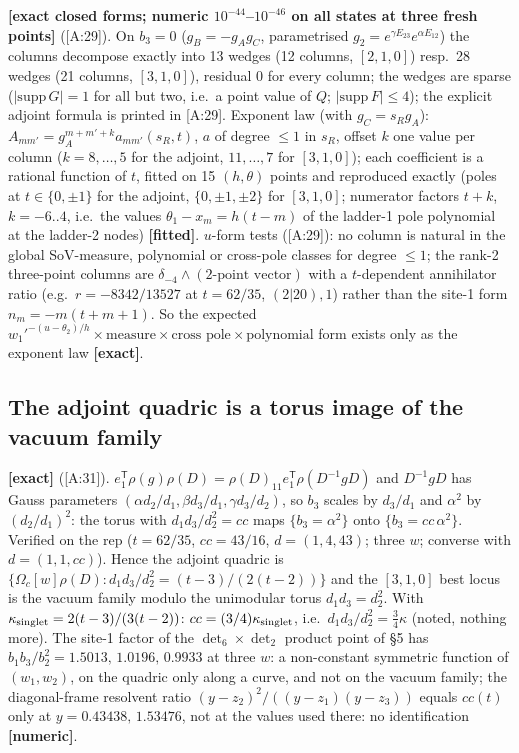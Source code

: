 \documentclass[10pt]{article}
\newcommand{\nb}[1]{\texttt{\path{#1}}}
\newcommand{\cl}[2]{\textsf{[#1:#2]}}
\newcommand{\tg}[1]{\textbf{[#1]}}
\newcommand{\Om}{\Omega}
\begin{document}
\tg{exact closed forms; numeric $10^{-44}$--$10^{-46}$ on all states at three fresh points} (\cl{A}{29}). On $b_3=0$ ($g_B=-g_Ag_C$, parametrised $g_2=e^{\gamma E_{23}}e^{\alpha E_{12}}$) the columns decompose exactly into 13 wedges (12 columns, $[2,1,0]$) resp.\ 28 wedges (21 columns, $[3,1,0]$), residual 0 for every column; the wedges are sparse ($|\mathrm{supp}\,G|=1$ for all but two, i.e.\ a point value of $Q$; $|\mathrm{supp}\,F|\le4$); the explicit adjoint formula is printed in \cl{A}{29}. Exponent law (with $g_C=s_Rg_A$): $A_{mm'}=g_A^{m+m'+k}a_{mm'}(s_R,t)$, $a$ of degree $\le1$ in $s_R$, offset $k$ one value per column ($k=8,\dots,5$ for the adjoint, $11,\dots,7$ for $[3,1,0]$); each coefficient is a rational function of $t$, fitted on 15 $(h,\theta)$ points and reproduced exactly (poles at $t\in\{0,\pm1\}$ for the adjoint, $\{0,\pm1,\pm2\}$ for $[3,1,0]$; numerator factors $t+k$, $k=-6..4$, i.e.\ the values $\theta_1-x_m=h(t-m)$ of the ladder-1 pole polynomial at the ladder-2 nodes) \tg{fitted}. $u$-form tests (\cl{A}{29}): no column is natural in the global SoV-measure, polynomial or cross-pole classes for degree $\le1$; the rank-2 three-point columns are $\delta_{-4}\wedge(\text{2-point vector})$ with a $t$-dependent annihilator ratio (e.g.\ $r=-8342/13527$ at $t=62/35$, $(2|20),1$) rather than the site-1 form $n_m=-m(t+m+1)$. So the expected $w_1'^{-(u-\theta_2)/h}\times\text{measure}\times\text{cross pole}\times\text{polynomial}$ form exists only as the exponent law \tg{exact}.

\subsection{The adjoint quadric is a torus image of the vacuum family}\label{sec:Atorus}

\tg{exact} (\cl{A}{31}). $e_1^{\mathsf T}\rho(g)\rho(D)=\rho(D)_{11}e_1^{\mathsf T}\rho(D^{-1}gD)$ and $D^{-1}gD$ has Gauss parameters $(\alpha d_2/d_1,\beta d_3/d_1,\gamma d_3/d_2)$, so $b_3$ scales by $d_3/d_1$ and $\alpha^2$ by $(d_2/d_1)^2$: the torus with $d_1d_3/d_2^2=cc$ maps $\{b_3=\alpha^2\}$ onto $\{b_3=cc\,\alpha^2\}$. Verified on the rep ($t=62/35$, $cc=43/16$, $d=(1,4,43)$; three $w$; converse with $d=(1,1,cc)$). Hence the adjoint quadric is $\{\Om_c[w]\rho(D):d_1d_3/d_2^2=(t-3)/(2(t-2))\}$ and the $[3,1,0]$ best locus is the vacuum family modulo the unimodular torus $d_1d_3=d_2^2$. With $\kappa_{\rm singlet}=2(t-3)/(3(t-2))$: $cc=(3/4)\kappa_{\rm singlet}$, i.e.\ $d_1d_3/d_2^2=\tfrac34\kappa$ (noted, nothing more). The site-1 factor of the $\det_6\times\det_2$ product point of \nb{Two-rotations-det-overlap.md} \S5 has $b_1b_3/b_2^2=1.5013,\,1.0196,\,0.9933$ at three $w$: a non-constant symmetric function of $(w_1,w_2)$, on the quadric only along a curve, and not on the vacuum family; the diagonal-frame resolvent ratio $(y-z_2)^2/((y-z_1)(y-z_3))$ equals $cc(t)$ only at $y=0.43438,\,1.53476$, not at the values used there: no identification \tg{numeric}.
\end{document}
